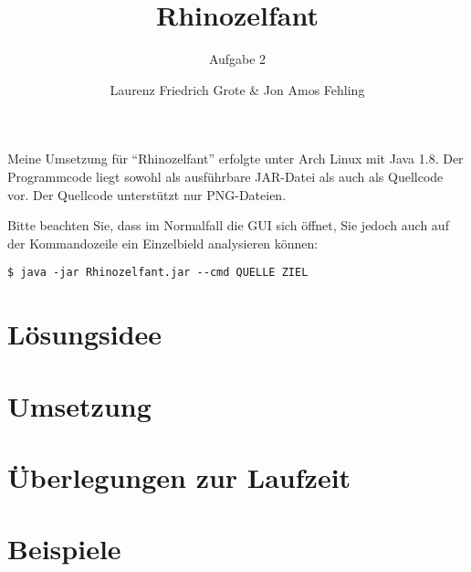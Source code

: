 \documentclass[parskip=full, DIV=14]{scrartcl}
\newcommand{\shellcmd}[1]{\texttt{\$ #1}\\}
\begin{document}
	\titlehead{35. Bundeswettbewerb Informatik \hfill Team 00001, Teilnahme 6745}
	\title{Rhinozelfant}
	\subtitle{Aufgabe 2}
	\author{Laurenz Friedrich Grote \& Jon Amos Fehling}
	\date{}
	\maketitle
	\tableofcontents
	
	\vspace {3em}

	Meine Umsetzung für "`Rhinozelfant"' erfolgte unter Arch Linux mit Java 1.8. Der Programmcode liegt sowohl als ausführbare JAR-Datei als auch als Quellcode vor. Der Quellcode unterstützt nur PNG-Dateien.

	Bitte beachten Sie, dass im Normalfall die GUI sich öffnet, Sie jedoch auch auf der Kommandozeile ein Einzelbield analysieren können:

	\shellcmd{java -jar Rhinozelfant.jar -{}-cmd QUELLE ZIEL}

	\clearpage
	\section{Lösungsidee}
		
	\clearpage
	\section{Umsetzung}
		
	\clearpage
	\section{Überlegungen zur Laufzeit}
		
	\clearpage
	\section{Beispiele}
		
\end{document}
